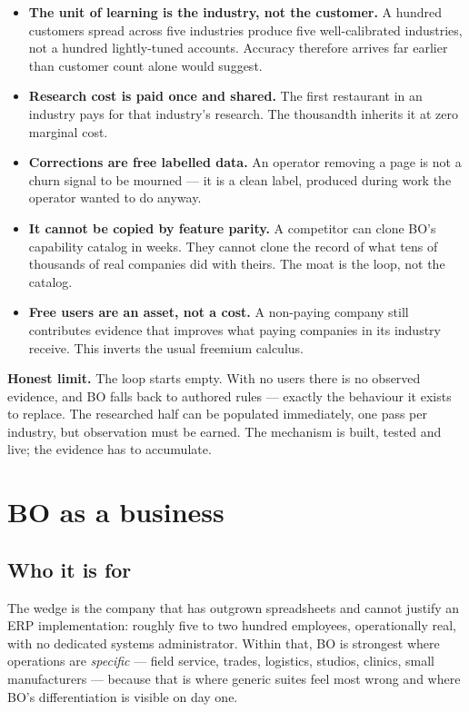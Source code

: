 \documentclass[11pt,a4paper]{article}
\newenvironment{callout}%
{\begin{center}\begin{lrbox}{\calloutbox}\begin{minipage}{\dimexpr0.94\textwidth-24pt\relax}\color{bodark}}%
{\end{minipage}\end{lrbox}\setlength{\fboxsep}{12pt}\colorbox{bosoft}{\usebox{\calloutbox}}\end{center}}
\begin{document}
\begin{itemize}[leftmargin=1.4em,itemsep=3pt]
  \item \textbf{The unit of learning is the industry, not the customer.} A hundred customers spread
        across five industries produce five well-calibrated industries, not a hundred lightly-tuned
        accounts. Accuracy therefore arrives far earlier than customer count alone would suggest.
  \item \textbf{Research cost is paid once and shared.} The first restaurant in an industry pays for
        that industry's research. The thousandth inherits it at zero marginal cost.
  \item \textbf{Corrections are free labelled data.} An operator removing a page is not a churn
        signal to be mourned --- it is a clean label, produced during work the operator wanted to do
        anyway.
  \item \textbf{It cannot be copied by feature parity.} A competitor can clone BO's capability
        catalog in weeks. They cannot clone the record of what tens of thousands of real companies
        did with theirs. The moat is the loop, not the catalog.
  \item \textbf{Free users are an asset, not a cost.} A non-paying company still contributes
        evidence that improves what paying companies in its industry receive. This inverts the usual
        freemium calculus.
\end{itemize}

\begin{callout}
\textbf{Honest limit.} The loop starts empty. With no users there is no observed evidence, and BO
falls back to authored rules --- exactly the behaviour it exists to replace. The researched half can
be populated immediately, one pass per industry, but observation must be earned. The mechanism is
built, tested and live; the evidence has to accumulate.
\end{callout}

\section{BO as a business}

\subsection{Who it is for}

The wedge is the company that has outgrown spreadsheets and cannot justify an ERP implementation:
roughly five to two hundred employees, operationally real, with no dedicated systems administrator.
Within that, BO is strongest where operations are \emph{specific} --- field service, trades,
logistics, studios, clinics, small manufacturers --- because that is where generic suites feel most
wrong and where BO's differentiation is visible on day one.
\end{document}
